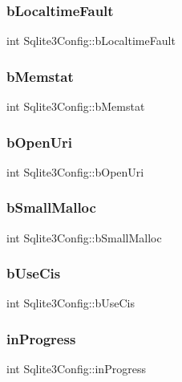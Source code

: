 \subsubsection{bLocaltimeFault}
{\footnotesize\ttfamily int Sqlite3\+Config\+::b\+Localtime\+Fault}

\mbox{\label{struct_sqlite3_config_aae01de5f37a66422f2a7413e108e03fe}} 
\subsubsection{bMemstat}
{\footnotesize\ttfamily int Sqlite3\+Config\+::b\+Memstat}

\mbox{\label{struct_sqlite3_config_af446c9f0657e5564b4dbba3421ffc8be}} 
\subsubsection{bOpenUri}
{\footnotesize\ttfamily int Sqlite3\+Config\+::b\+Open\+Uri}

\mbox{\label{struct_sqlite3_config_a87fb14524f63e413283cac99e8feb502}} 
\subsubsection{bSmallMalloc}
{\footnotesize\ttfamily int Sqlite3\+Config\+::b\+Small\+Malloc}

\mbox{\label{struct_sqlite3_config_a3eb3eb5fe14358aba2a6e0083f29d807}} 
\subsubsection{bUseCis}
{\footnotesize\ttfamily int Sqlite3\+Config\+::b\+Use\+Cis}

\mbox{\label{struct_sqlite3_config_a3cc1f0564475ead1840892e8ac6989ed}} 
\subsubsection{inProgress}
{\footnotesize\ttfamily int Sqlite3\+Config\+::in\+Progress}

